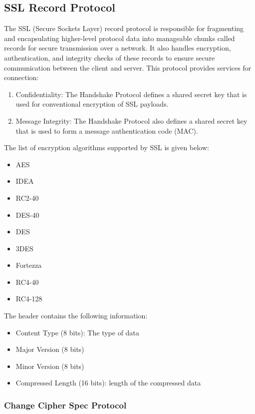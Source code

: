 \documentclass[11pt]{article}
\begin{document}
\subsection{SSL Record Protocol}

The SSL (Secure Sockets Layer) record protocol is responsible for fragmenting and encapsulating higher-level protocol data into manageable chunks called records for secure transmission over a network. It also handles encryption, authentication, and integrity checks of these records to ensure secure communication between the client and server. This protocol provides services for connection:

\begin{enumerate}
    \item Confidentiality: The Handshake Protocol defines a shared secret key that is used for conventional encryption of SSL payloads.
    \item Message Integrity: The Handshake Protocol also defines a shared secret key that is used to form a message authentication code (MAC).
\end{enumerate}

The list of encryption algorithms supported by SSL is given below:

\begin{itemize}
    \item AES
    \item IDEA
    \item RC2-40
    \item DES-40
    \item DES
    \item 3DES
    \item Fortezza
    \item RC4-40
    \item RC4-128
\end{itemize}

The header contains the following information:

\begin{itemize}
    \item Content Type (8 bits): The type of data
    \item Major Version (8 bits)
    \item Minor Version (8 bits)
    \item Compressed Length (16 bits): length of the compressed data
\end{itemize}

\subsubsection{Change Cipher Spec Protocol}
\end{document}
